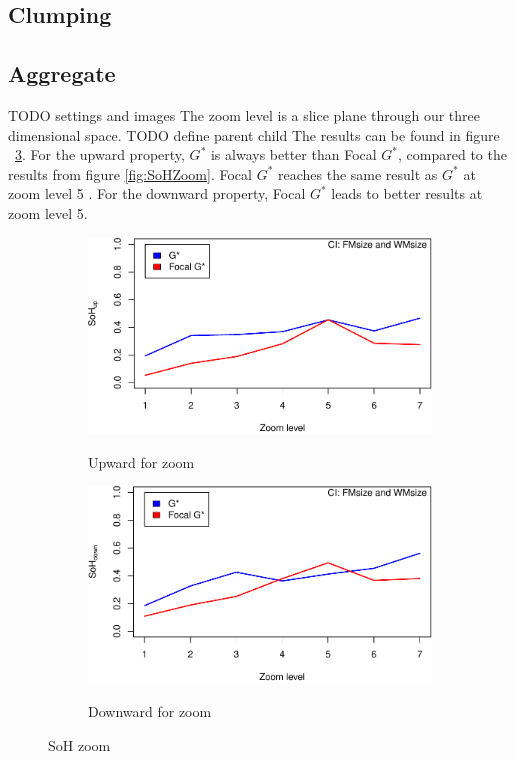 \documentclass{itatnew}
\begin{document}
\subsection{Clumping}

\subsection{Aggregate}

TODO settings and images
The zoom level is a slice plane through our three dimensional space. 
TODO define parent child
The results can be found in figure ~\ref{fig:Zoom}.
For the upward property, $G^*$ is always better than Focal $G^*$, compared to the results from figure
\ref{fig:SoHZoom}. Focal $G^*$ reaches the same result as $G^*$ at zoom level 5 .
For the downward property, Focal $G^*$ leads to better results at zoom level 5.

\begin{figure}[htp]
  \begin{subfigure}{\linewidth}
    \caption{Upward for zoom}
    \includegraphics[width=\linewidth]{images/gen-zoom-sohup-1}
    \label{fig:UpwardZoom}
  \end{subfigure}
  \hspace{1em}
  \begin{subfigure}{\linewidth}
    \caption{Downward for zoom}
    \includegraphics[width=\linewidth]{images/gen-zoom-sohdown-1}
    \label{fig:DownwardZoom}
  \end{subfigure}
  \caption{SoH zoom}
  \label{fig:Zoom}
\end{figure}
\end{document}
